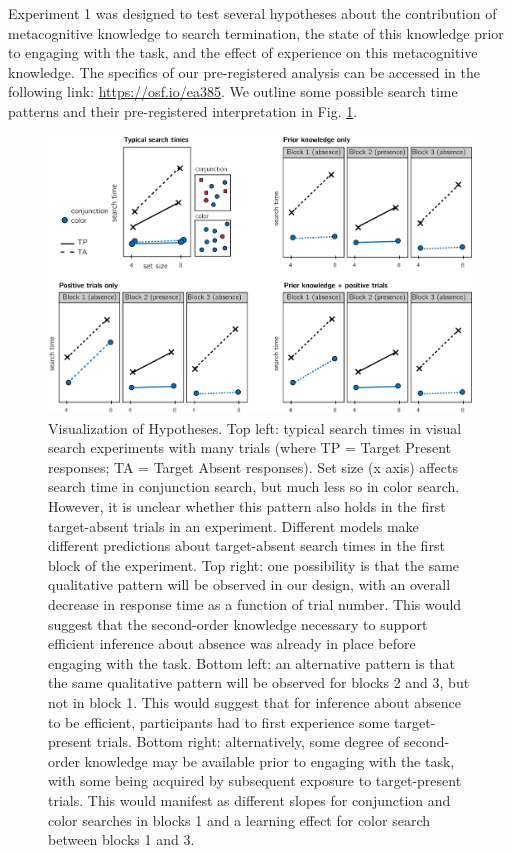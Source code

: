 \documentclass[12pt,twoside]{reedthesis}
\begin{document}
Experiment 1 was designed to test several hypotheses about the contribution of metacognitive knowledge to search termination, the state of this knowledge prior to engaging with the task, and the effect of experience on this metacognitive knowledge. The specifics of our pre-registered analysis can be accessed in the following link: \url{https://osf.io/ea385}. We outline some possible search time patterns and their pre-registered interpretation in Fig. \ref{fig:termination-models}.
\begin{figure}
\includegraphics[width=1\linewidth]{figure/termination/models} \caption[Pre-registered termination models and the predictions they make for the first trials.]{Visualization of Hypotheses. Top left: typical search times in visual search experiments with many trials (where TP = Target Present responses; TA = Target Absent responses). Set size (x axis) affects search time in conjunction search, but much less so in color search. However, it is unclear whether this pattern also holds in the first target-absent trials in an experiment. Different models make different predictions about target-absent search times in the first block of the experiment. Top right: one possibility is that the same qualitative pattern will be observed in our design, with an overall decrease in response time as a function of trial number. This would suggest that the second-order knowledge necessary to support efficient inference about absence was already in place before engaging with the task. Bottom left: an alternative pattern is that the same qualitative pattern will be observed for blocks 2 and 3, but not in block 1. This would suggest that for inference about absence to be efficient, participants had to first experience some target-present trials. Bottom right: alternatively, some degree of second-order knowledge may be available prior to engaging with the task, with some being acquired by subsequent exposure to target-present trials. This would manifest as different slopes for conjunction and color searches in blocks 1 and a learning effect for color search between blocks 1 and 3.}\label{fig:termination-models}
\end{figure}
\end{document}
